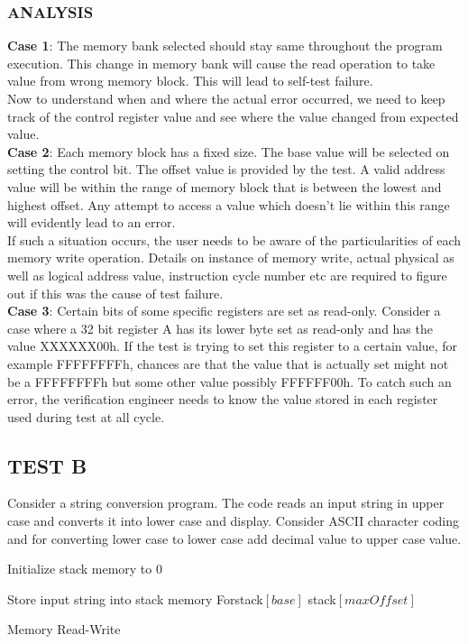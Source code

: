 \subsubsection{ANALYSIS}
{\bf Case 1}: The memory bank selected should stay same throughout the program execution. This change in memory bank will cause the read operation to take value from wrong memory block. This will lead to self-test failure. \\
 Now to understand when and where the actual error occurred, we need to keep track of the control register value and see where the value changed from expected value. \\
{\bf Case 2}: Each memory block has a fixed size. The base value will be selected on setting the control bit. The offset value is provided by the test. A valid address value will be within the range of memory block that is between the lowest and highest offset. Any attempt to access a value which doesn't lie within this range will evidently lead to an error.\\
If such a situation occurs, the user needs to be aware of the particularities of each memory write operation. Details on instance of memory write, actual physical as well as logical address value, instruction cycle number etc are required to figure out if this was the cause of test failure.\\
{\bf Case 3}: Certain bits of some specific registers are set as read-only. Consider a case where a 32 bit register A has its lower byte set as read-only and has the value XXXXXX00h. If the test is trying to set this register to a certain value, for example FFFFFFFFh, chances are that the value that is actually set might not be a FFFFFFFFh but some other value possibly FFFFFF00h. 
To catch such an error, the verification engineer needs to know the value stored in each register used during test at all cycle.



\subsection {TEST B}
Consider a string conversion program. The code reads an input string in upper case and converts it into lower case and display. Consider ASCII character coding and for converting lower case to lower case add decimal value to upper case value.



\vspace{1.5cm}
\IncMargin{1em}
\begin{algorithm}[H]
\DontPrintSemicolon
{}

\BlankLine
Initialize stack memory to 0 \;

	Store input string into stack memory\;
	For{stack$[base]$ \KwTo stack$[maxOffset]$}{\;
		
	}

\caption{Memory Read-Write}
\end{algorithm}\DecMargin{1em}

